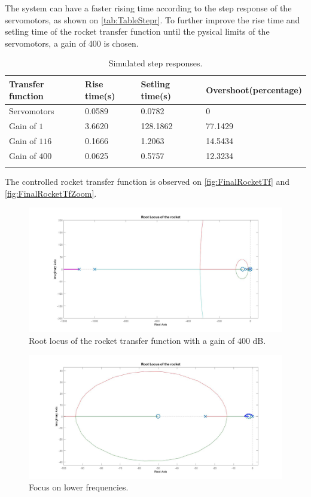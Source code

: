 The system can have a faster rising time according to the step response of the servomotors, as shown on \autoref{tab:TableStepr}. To further improve the rise time and setling time of the rocket transfer function until the pysical limits of the servomotors, a gain of 400 is chosen. 

\begin{table}[htbp]
	\centering
	\caption{Simulated step responses.}
	\label{tab:TableStepr}
	\begin{tabular}{llll}
		Transfer function & Rise time{(}s{)} & Setling time{(}s{)} & Overshoot{(}percentage{)} \\ \hline  \rowcolor{lightGrey}
		Servomotors     & 0.0589 & 0.0782 & 0\\  
		Gain of $1$     & 3.6620 & 128.1862 & 77.1429  \\  
		\rowcolor{lightGrey}           
		Gain of $116$     & 0.1666 & 1.2063 & 14.5434  \\
		Gain of $400$     & 0.0625 & 0.5757 & 12.3234      \\  
		\rowcolor{lightGrey}     
	\end{tabular}
\end{table}

The controlled rocket transfer function is observed on \autoref{fig:FinalRocketTf} and \autoref{fig:FinalRocketTfZoom}. 
\begin{figure}[htbp]
	\centering
	\includegraphics[width=\textwidth]{figures/Rocket/design/tf_with_controller_483}
	\caption{Root locus of the rocket transfer function with a gain of $400$ \si{\dB}.}
	\label{fig:FinalRocketTf}
\end{figure}

\begin{figure}[htbp]
	\centering
	\includegraphics[width=\textwidth]{figures/Rocket/design/tf_with_controller_483_zoom}
	\caption{Focus on lower frequencies.}
	\label{fig:FinalRocketTfZoom}
\end{figure}

